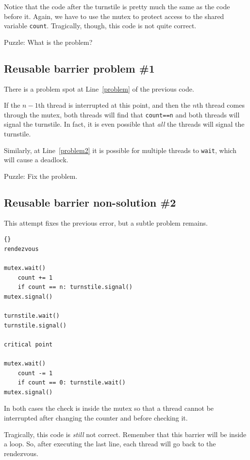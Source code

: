 \documentclass{book}
\newcommand{\clearemptydoublepage}{\newpage\cleardoublepage}
\begin{document}
Notice that the code after the turnstile is pretty much the same as
the code before it.  Again, we have to use the mutex to protect access
to the shared variable {\tt count}.
Tragically, though, this code is not quite correct.

Puzzle: What is the problem?


\clearemptydoublepage
\subsection {Reusable barrier problem \#1}

There is a problem spot at Line~\ref{problem} of the previous code.

If the $n-1$th thread is interrupted at this point,
and then the $n$th thread comes through the mutex,
both threads will find that {\tt count==n} and both
threads will signal the turnstile.  In fact, it is even
possible that {\em all} the threads will signal the turnstile.

Similarly, at Line~\ref{problem2} it is possible for multiple
threads to {\tt wait}, which will cause a deadlock.

Puzzle: Fix the problem.

\clearemptydoublepage
\subsection {Reusable barrier non-solution \#2}

This attempt fixes the previous error, but a subtle problem
remains.

\begin{lstlisting}[title={Reusable barrier non-solution}]{}
rendezvous

mutex.wait()
    count += 1
    if count == n: turnstile.signal()
mutex.signal()

turnstile.wait()
turnstile.signal()

critical point

mutex.wait()
    count -= 1
    if count == 0: turnstile.wait()
mutex.signal()
\end{lstlisting}

In both cases the check is inside the mutex so that
a thread cannot be interrupted after changing the counter
and before checking it.

Tragically, this code is {\em still} not correct.
Remember that this barrier will be inside a loop.  So, after
executing the last line, each thread will go back
to the rendezvous.
\end{document}
